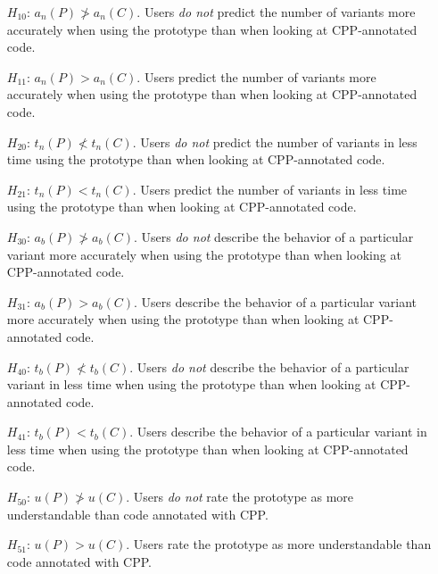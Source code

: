 \documentclass[11pt]{article}
\begin{document}
	\begin{enumerate}[leftmargin=*,labelindent=\parindent]
		
		\item[$H_{10}$:]
		$a_n(P) \not> a_n(C)$.
		Users \emph{do not} predict the number of variants more
		accurately when using the prototype than when looking at CPP-annotated code.
		
		\item[$H_{11}$:]
		$a_n(P)     > a_n(C)$.
		Users predict the number of variants more
		accurately when using the prototype than when looking at CPP-annotated code.
		
		\item[$H_{20}$:]
		$t_n(P) \not< t_n(C)$.
		Users \emph{do not} predict the number of variants in less
		time using the prototype than when looking at CPP-annotated code.
		
		\item[$H_{21}$:]
		$t_n(P)     < t_n(C)$.
		Users predict the number of variants in less
		time using the prototype than when looking at CPP-annotated code.
		
		\item[$H_{30}$:]
		$a_b(P) \not> a_b(C)$.
		Users \emph{do not} describe the behavior of a particular
		variant more accurately when using the prototype than when looking at
		CPP-annotated code.
		
		\item[$H_{31}$:]
		$a_b(P)     > a_b(C)$.
		Users describe the behavior of a particular
		variant more accurately when using the prototype than when looking at
		CPP-annotated code.
		
		\item[$H_{40}$:]
		$t_b(P) \not< t_b(C)$.
		Users \emph{do not} describe the behavior of a particular
		variant in less time when using the prototype than when looking at
		CPP-annotated code.
		
		\item[$H_{41}$:]
		$t_b(P)     < t_b(C)$.
		Users describe the behavior of a particular
		variant in less time when using the prototype than when looking at
		CPP-annotated code.
		
		\item[$H_{50}$:]
		$u(P)   \not> u(C)  $.
		Users \emph{do not} rate the prototype as more understandable
		than code annotated with CPP.
		
		\item[$H_{51}$:]
		$u(P)       > u(C)  $.
		Users rate the prototype as more understandable
		than code annotated with CPP.
		
	\end{enumerate}
	
\end{document}
